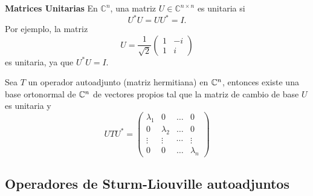 \documentclass[main.tex]{subfiles}
\begin{document}
\eje\textbf{Matrices Unitarias}
En $\mathbb{C}^n$, una matriz $U \in \mathbb{C}^{n \times n}$ es unitaria si
\[
U^* U = U U^* = I.
\]
Por ejemplo, la matriz
\[
U = \frac{1}{\sqrt{2}} \begin{pmatrix}
1 & -i \\
1 & i
\end{pmatrix}
\]
es unitaria, ya que $U^* U = I$.
\begin{teorema}
Sea \(T\) un operador autoadjunto (matriz hermitiana) en $\mathbb{C}^n$, entonces existe una base ortonormal de \(\mathbb{C}^n\) de vectores propios tal que la matriz de cambio de base \(U\) es unitaria y
\[
UTU^{*}= \begin{pmatrix}\lambda_{1}& 0 & \dots & 0\\ 0 & \lambda_{2} & \dots & 0\\ \vdots & \vdots & \cdots & \vdots\\ 0 & 0 & \dots & \lambda_{n} \end{pmatrix}
\]
\end{teorema}
\subsection{Operadores de Sturm-Liouville autoadjuntos}
\end{document}
